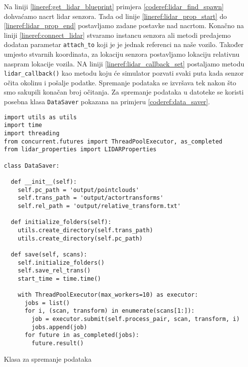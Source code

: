 Na liniji \ref{lineref:get_lidar_blueprint} primjera \ref{coderef:lidar_find_spawn} dohvaćamo nacrt lidar senzora. Tada od linije \ref{lineref:lidar_prop_start} do \ref{lineref:lidar_prop_end} postavljamo zadane postavke nad nacrtom. Konačno na liniji \ref{lineref:connect_lidar} stvaramo instancu senzora ali metodi predajemo dodatan parametar \texttt{attach_to} koji je je jednak referenci na naše vozilo. Također umjesto stvarnih koordinata, za lokaciju senzora postavljamo lokaciju relativnu naspram lokacije vozila. NA liniji \ref{lineref:lidar_callback_set} postaljamo metodu \texttt{lidar_callback()} kao metodu koju će simulator pozvati svaki puta kada senzor očita okolinu i pošalje podatke.
Spremanje podataka se izvršava tek nakon što smo sakupili konačan broj očitanja. Za spremanje podataka u datoteke se koristi posebna klasa \texttt{DataSaver} pokazana na primjeru \ref{coderef:data_saver}.

\begin{listing}[h!]
  \begin{verbatim}
import utils as utils
import time
import threading
from concurrent.futures import ThreadPoolExecutor, as_completed
from lidar_properties import LIDARProperties

class DataSaver:

  def __init__(self):
    self.pc_path = 'output/pointclouds'
    self.trans_path = 'output/actortransforms'
    self.rel_path = 'output/relative_transform.txt'

  def initialize_folders(self):
    utils.create_directory(self.trans_path)
    utils.create_directory(self.pc_path)

  def save(self, scans):
    self.initialize_folders()
    self.save_rel_trans()
    start_time = time.time()

    with ThreadPoolExecutor(max_workers=10) as executor:
      jobs = list()
      for i, (scan, transform) in enumerate(scans[1:]):
        job = executor.submit(self.process_pair, scan, transform, i)
        jobs.append(job)
      for future in as_completed(jobs):
        future.result()

  \end{verbatim}
  \caption{Klasa za spremanje podataka}
  \label{coderef:data_saver}
\end{listing}

